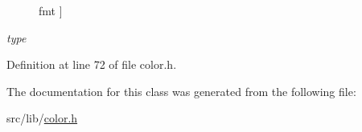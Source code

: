 \begin{Desc}
\begin{description}
{fmt\hypertarget{classcv_1_1DataType_3_1_1tlz_1_1rgb__color_01_4_ab5eeba9b783966286de7f0dc81e4e692a5315ec6989ec578226c553ee20335ea6}{}\label{classcv_1_1DataType_3_1_1tlz_1_1rgb__color_01_4_ab5eeba9b783966286de7f0dc81e4e692a5315ec6989ec578226c553ee20335ea6}
}]\item[{\em 
type\hypertarget{classcv_1_1DataType_3_1_1tlz_1_1rgb__color_01_4_ab5eeba9b783966286de7f0dc81e4e692af82d34097ed7a5f81aaa82e5e2aff035}{}\label{classcv_1_1DataType_3_1_1tlz_1_1rgb__color_01_4_ab5eeba9b783966286de7f0dc81e4e692af82d34097ed7a5f81aaa82e5e2aff035}
}]\end{description}
\end{Desc}


Definition at line 72 of file color.\+h.



The documentation for this class was generated from the following file\+:\begin{DoxyCompactItemize}
\item 
src/lib/\hyperlink{color_8h}{color.\+h}\end{DoxyCompactItemize}

